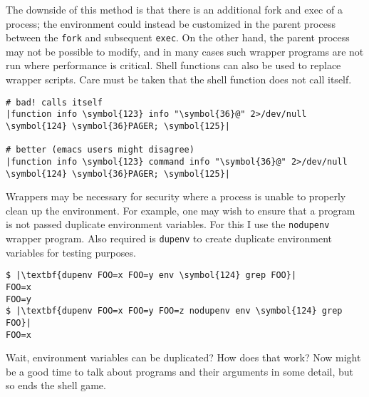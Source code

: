 \documentclass[10pt,a4paper]{article}
\begin{document}
The downside of this method is that there is an additional fork and exec
of a process; the environment could instead be customized in the parent
process between the \texttt{fork} and subsequent \texttt{exec}. On the
other hand, the parent process may not be possible to modify, and in
many cases such wrapper programs are not run where performance is
critical. Shell functions can also be used to replace wrapper scripts.
Care must be taken that the shell function does not call itself.

\begin{lstlisting}
# bad! calls itself
|function info \symbol{123} info "\symbol{36}@" 2>/dev/null \symbol{124} \symbol{36}PAGER; \symbol{125}|

# better (emacs users might disagree)
|function info \symbol{123} command info "\symbol{36}@" 2>/dev/null \symbol{124} \symbol{36}PAGER; \symbol{125}|
\end{lstlisting}

Wrappers may be necessary for security where a process is unable to
properly clean up the environment. For example, one may wish to
ensure that a program is not passed duplicate environment variables.
For this I use the \texttt{nodupenv} wrapper program. Also required
is \texttt{dupenv} to create duplicate environment variables for
testing purposes.

\begin{lstlisting}
$ |\textbf{dupenv FOO=x FOO=y env \symbol{124} grep FOO}|
FOO=x
FOO=y
$ |\textbf{dupenv FOO=x FOO=y FOO=z nodupenv env \symbol{124} grep FOO}|
FOO=x
\end{lstlisting}

Wait, environment variables can be duplicated? How does that work? Now
might be a good time to talk about programs and their arguments in some
detail, but so ends the shell game.


\end{document}
